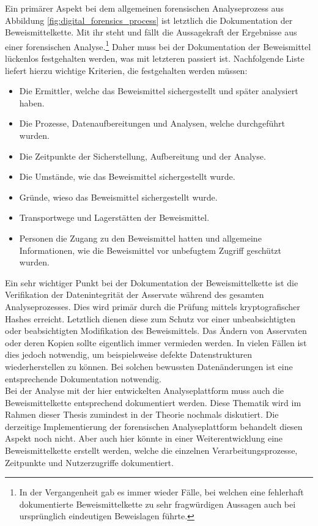 \noindent
Ein primärer Aspekt bei dem allgemeinen forensischen Analyseprozess aus Abbildung \ref{fig:digital_forensics_process} ist letztlich die Dokumentation der Beweismittelkette. Mit ihr steht und fällt die Aussagekraft der Ergebnisse aus einer forensischen Analyse.\footnote{In der Vergangenheit gab es immer wieder Fälle, bei welchen eine fehlerhaft dokumentierte Beweismittelkette zu sehr fragwürdigen Aussagen auch bei ursprünglich eindeutigen Beweislagen führte.} Daher muss bei der Dokumentation der Beweismittel lückenlos festgehalten werden, was mit letzteren passiert ist. Nachfolgende Liste liefert hierzu wichtige Kriterien, die festgehalten werden müssen:
\begin{itemize}
\item Die Ermittler, welche das Beweismittel sichergestellt und später analysiert haben.
\item Die Prozesse, Datenaufbereitungen und Analysen, welche durchgeführt wurden.
\item Die Zeitpunkte der Sicherstellung, Aufbereitung und der Analyse.
\item Die Umstände, wie das Beweismittel sichergestellt wurde.
\item Gründe, wieso das Beweismittel sichergestellt wurde.
\item Transportwege und Lagerstätten der Beweismittel.
\item Personen die Zugang zu den Beweismittel hatten und allgemeine Informationen, wie die Beweismittel vor unbefugtem Zugriff geschützt wurden.
\end{itemize}

\noindent
Ein sehr wichtiger Punkt bei der Dokumentation der Beweismittelkette ist die Verifikation der Datenintegrität der Asservate während des gesamten Analyseprozesses. Dies wird primär durch die Prüfung mittels kryptografischer Hashes erreicht. Letztlich dienen diese zum Schutz vor einer unbeabsichtigten oder beabsichtigten Modifikation des Beweismittels. Das Ändern von Asservaten oder deren Kopien sollte eigentlich immer vermieden werden. In vielen Fällen ist dies jedoch notwendig, um beispielsweise defekte Datenstrukturen wiederherstellen zu können. Bei solchen bewussten Datenänderungen ist eine entsprechende Dokumentation notwendig.\\ 
Bei der Analyse mit der hier entwickelten Analyseplattform muss auch die Beweismittelkette entsprechend dokumentiert werden. Diese Thematik wird im Rahmen dieser Thesis zumindest in der Theorie nochmals diskutiert. Die derzeitige Implementierung der forensischen Analyseplattform behandelt diesen Aspekt noch nicht. Aber auch hier könnte in einer Weiterentwicklung eine Beweismittelkette erstellt werden, welche die einzelnen Verarbeitungsprozesse, Zeitpunkte und Nutzerzugriffe dokumentiert.\\



